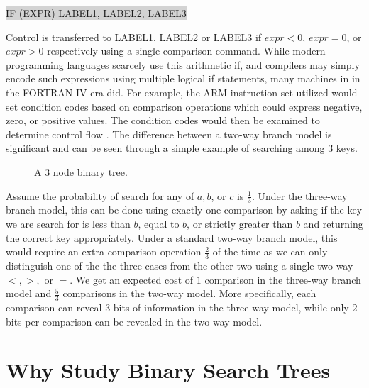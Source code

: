 \documentclass[letterpaper,12pt,titlepage,oneside,final]{book}
\theoremstyle{plain}
\begin{document}
\colorbox{lightgrey}{ \selectfont \uppercase{IF (expr) label1, label2, label3} } 
 
\noindent Control is transferred to \uppercase{label1}, \uppercase{label2} or \uppercase{label3} if $expr < 0$, $expr=0$, or $expr > 0$ respectively using a single comparison command. While modern programming languages scarcely use this arithmetic if, and compilers may simply encode such expressions using multiple logical if statements, many machines in in the FORTRAN IV era did. For example, the ARM instruction set utilized would set condition codes based on comparison operations which could express negative, zero, or positive values. The condition codes would then be examined to determine control flow \cite{TODO ARM CITE}. The difference between a two-way branch model is significant and can be seen through a simple example of searching among 3 keys.

\begin{figure}[!ht]
\begin{center}

\caption{A 3 node binary tree.}

\end{center}
\end{figure}

Assume the probability of search for any of $a,b$, or $c$ is $\frac{1}{3}$. Under the three-way branch model, this can be done using exactly one comparison by asking if the key we are search for is less than $b$, equal to $b$, or strictly greater than $b$ and returning the correct key appropriately. Under a standard two-way branch model, this would require an extra comparison operation $\frac{2}{3}$ of the time as we can only distinguish one of the the three cases from the other two using a single two-way $<, >,$ or $=$. We get an expected cost of $1$ comparison in the three-way branch model and $\frac{5}{3}$ comparisons in the two-way model. More specifically, each comparison can reveal $3$ bits of information in the three-way model, while only $2$ bits per comparison can be revealed in the two-way model. 

\section{Why Study Binary Search Trees}
\end{document}
